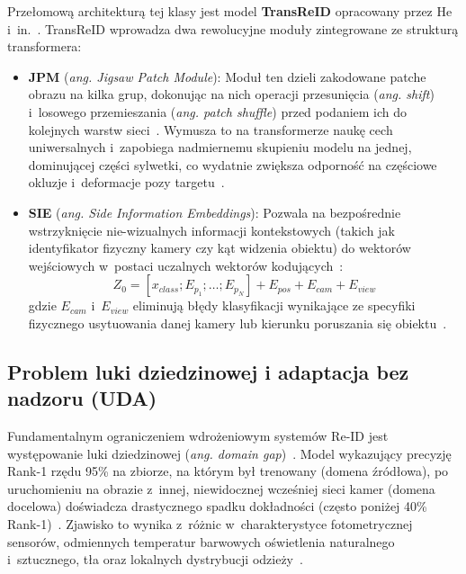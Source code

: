 Przełomową architekturą tej klasy jest model \textbf{TransReID} opracowany przez He
i~in.~\cite{he2021transreid}. TransReID wprowadza dwa rewolucyjne moduły zintegrowane ze strukturą
transformera:
\begin{itemize}
  \item \textbf{JPM} (\textit{ang. Jigsaw Patch Module}): Moduł ten dzieli zakodowane patche obrazu na kilka grup, dokonując na nich operacji przesunięcia (\textit{ang. shift}) i~losowego przemieszania (\textit{ang. patch shuffle}) przed podaniem ich do kolejnych warstw sieci~\cite{he2021transreid}. Wymusza to na transformerze naukę cech uniwersalnych i~zapobiega nadmiernemu skupieniu modelu na jednej, dominującej części sylwetki, co wydatnie zwiększa odporność na częściowe okluzje i~deformacje pozy targetu~\cite{he2021transreid}.
  \item \textbf{SIE} (\textit{ang. Side Information Embeddings}): Pozwala na bezpośrednie wstrzyknięcie nie-wizualnych informacji kontekstowych (takich jak identyfikator fizyczny kamery czy kąt widzenia obiektu) do wektorów wejściowych w~postaci uczalnych wektorów kodujących~\cite{he2021transreid}:
        \begin{equation}
          Z_0 = [x_{class}; E_{p_1}; \dots; E_{p_N}] + E_{pos} + E_{cam} + E_{view}
          \label{eq:sie}
        \end{equation}
        gdzie $E_{cam}$ i~$E_{view}$ eliminują błędy klasyfikacji wynikające ze specyfiki fizycznego usytuowania danej kamery lub kierunku poruszania się obiektu~\cite{he2021transreid}.
\end{itemize}

\subsection{Problem luki dziedzinowej i adaptacja bez nadzoru (UDA)}
\label{subsec:domain_gap_reid}

Fundamentalnym ograniczeniem wdrożeniowym systemów Re-ID jest występowanie luki dziedzinowej
(\textit{ang. domain gap})~\cite{ristani2016}. Model wykazujący precyzję Rank-1 rzędu 95\% na
zbiorze, na którym był trenowany (domena źródłowa), po uruchomieniu na obrazie z~innej,
niewidocznej wcześniej sieci kamer (domena docelowa) doświadcza drastycznego spadku dokładności
(często poniżej 40\% Rank-1)~\cite{ristani2016, ge2020mutual}. Zjawisko to wynika z~różnic
w~charakterystyce fotometrycznej sensorów, odmiennych temperatur barwowych oświetlenia naturalnego
i~sztucznego, tła oraz lokalnych dystrybucji odzieży~\cite{ristani2016, ge2020mutual}.


